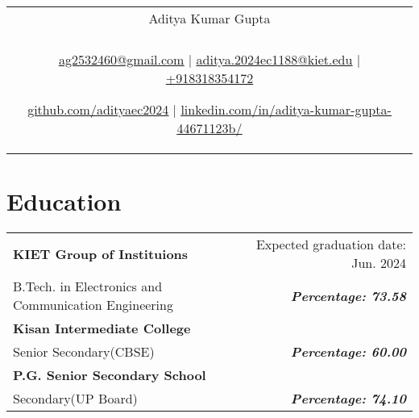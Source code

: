 \documentclass[a4paper,8pt]{article}
\begin{document}
\pagestyle{empty} 


\begin{tabularx}{\linewidth}{@{} C @{}}
\color[HTML]{1C033C} \Huge{Aditya Kumar Gupta} \\[6pt]
\\
\textcolor[HTML]{371e77}{\underline{\href{mailto:ag2532460@gmail.com}{\raisebox{-0.05\height}{\faEnvelope} ag2532460@gmail.com}} $|$}
\textcolor[HTML]{371e77}{\underline{\href{mailto:aditya.2024ec1188@kiet.edu}{\raisebox{-0.05\height}{\faEnvelope} aditya.2024ec1188@kiet.edu}} $|$}
\textcolor[HTML]{371e77}{\href{tel:+918318354172}{\raisebox{-0.05\height}{\faMobile} +918318354172}}

\textcolor[HTML]{371e77}{\underline{\href{https://github.com/adityaec2024}{\raisebox{-0.05\height}{\faGithub} github.com/adityaec2024}} $|$}
\textcolor[HTML]{371e77}{\underline{\href{https://www.linkedin.com/in/aditya-kumar-gupta-44671123b/}{\raisebox{-0.05\height}{\faLinkedin} linkedin.com/in/aditya-kumar-gupta-44671123b/}}}
\end{tabularx}

\section{Education}
\begin{tabularx}{\linewidth}{ @{}l r@{} }
\color[HTML]{1C033C} \textbf{KIET Group of Instituions} & \hfill \color[HTML]{371e77} Expected graduation date: Jun. 2024 \\
\color[HTML]{371e77} B.Tech. in Electronics and Communication Engineering  & \hfill \color[HTML]{4B28A4} \textit{\textbf{Percentage: 73.58}} \\
\color[HTML]{1C033C} \textbf{Kisan Intermediate College} & \hfill \color[HTML]{371e77}  \\
\color[HTML]{371e77} Senior Secondary(CBSE)  & \hfill \color[HTML]{4B28A4} \textit{\textbf{Percentage: 60.00}} \\
\color[HTML]{1C033C} \textbf{P.G. Senior Secondary School} & \hfill \color[HTML]{371e77} \\
\color[HTML]{371e77} Secondary(UP Board)  & \hfill \color[HTML]{4B28A4} \textit{\textbf{Percentage: 74.10}} \\
\end{tabularx}


\end{document}
